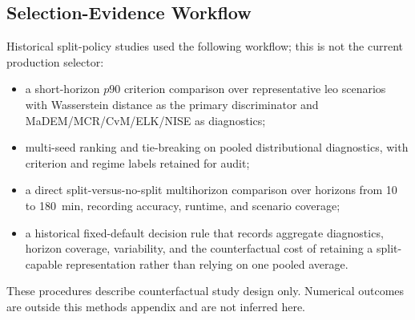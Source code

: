     \subsection{Selection-Evidence Workflow}
    Historical split-policy studies used the following workflow; this is not the current production selector:
    \begin{itemize}[leftmargin=*]
        \item a short-horizon \(p90\) criterion comparison over representative \gls{leo} scenarios with Wasserstein distance as the primary discriminator and MaDEM/MCR/CvM/ELK/NISE as diagnostics;
        \item multi-seed ranking and tie-breaking on pooled distributional diagnostics, with criterion and regime labels retained for audit;
        \item a direct split-versus-no-split multihorizon  comparison over horizons from 10 to \SI{180}{\minute}, recording accuracy, runtime, and scenario coverage;
        \item a historical fixed-default decision rule that records aggregate diagnostics, horizon coverage, variability, and the counterfactual cost of retaining a split-capable representation rather than relying on one pooled average.
    \end{itemize}
These procedures describe counterfactual study design only. Numerical outcomes are outside this methods appendix and are not inferred here.
